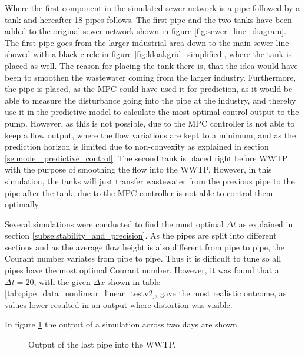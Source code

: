 Where the first component in the simulated sewer network is a pipe followed by a tank and hereafter 18 pipes follows. The first pipe and the two tanks have been added to the original sewer network shown in figure \ref{fig:sewer_line_diagram}. The first pipe goes from the larger industrial area down to the main sewer line showed with a black circle in figure \ref{fig:kloakgrid_simplified}, where the tank is placed as well. The reason for placing the tank there is, that the idea would have been to smoothen the wastewater coming from the larger industry. Furthermore, the pipe is placed, as the MPC could have used it for prediction, as it would be able to measure the disturbance going into the pipe at the industry, and thereby use it in the predictive model to calculate the most optimal control output to the pump. However, as this is not possible, due to the MPC controller is not able to keep a flow output, where the flow variations are kept to a minimum, and as the prediction horizon is limited due to non-convexity as explained in section \ref{se:model_predictive_control}. The second tank is placed right before WWTP with the purpose of smoothing the flow into the WWTP. However, in this simulation, the tanks will just transfer wastewater from the previous pipe to the pipe after the tank, due to the MPC controller is not able to control them optimally. 

Several simulations were conducted to find the must optimal $\Delta t$ as explained in section \ref{subse:stability_and_precision}. As the pipes are split into different sections and as the average flow height is also different from pipe to pipe, the Courant number variates from pipe to pipe. Thus it is difficult to tune so all pipes have the most optimal Courant number. However, it was found that a $\Delta t = 20$, with the given $\Delta x$ shown in table \ref{tab:pipe_data_nonlinear_linear_testv2}, gave the most realistic outcome, as values lower resulted in an output where distortion was visible.

In figure \ref{fig:simulation_output_first} the output of a simulation across two days are shown. 

\begin{figure}[H]
\centering

\caption{Output of the last pipe into the WWTP.}
\label{fig:simulation_output_first}
\end{figure}  

